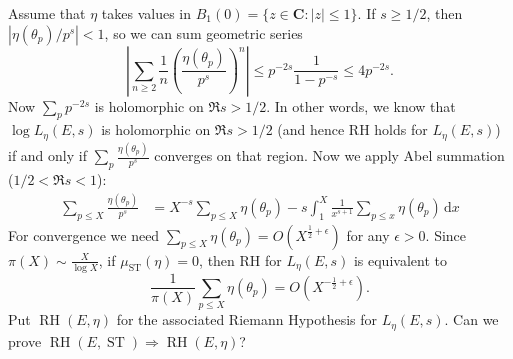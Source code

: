 \documentclass{article}
\DeclareMathOperator{\RH}{RH}
\DeclareMathOperator{\ST}{ST}
\newcommand{\bC}{\mathbf{C}}
\newcommand{\dd}{\mathrm{d}}
\numberwithin{theorem}{section}
\begin{document}
Assume that $\eta$ takes values in $B_1(0) = \{z\in \bC : |z|\leqslant 1\}$. 
If $s\geqslant 1/2$, then $|\eta(\theta_p) / p^s|<1$, so we can sum geometric 
series
\[
	\left| \sum_{n\geqslant 2} \frac{1}{n} \left(\frac{\eta(\theta_p)}{p^s}\right)^n \right|
		\leqslant p^{-2s} \frac{1}{1-p^{-s}} 
		\leqslant 4 p^{-2s}.
\]
Now $\sum_p p^{-2s}$ is holomorphic on $\Re s>1/2$. In other words, we know 
that $\log L_\eta(E,s)$ is holomorphic on $\Re s>1/2$ (and hence RH holds for 
$L_\eta(E,s)$) if and only if $\sum_p \frac{\eta(\theta_p)}{p^s}$ converges 
on that region. Now we apply Abel summation ($1/2<\Re s<1$):
\begin{align*}
	\sum_{p\leqslant X} \frac{\eta(\theta_p)}{p^s}
		&= X^{-s} \sum_{p\leqslant X} \eta(\theta_p) - s\int_1^X \frac{1}{x^{s+1}} \sum_{p\leqslant x} \eta(\theta_p) \, \dd x
\end{align*}
For convergence we need 
$\sum_{p\leqslant X} \eta(\theta_p) = O(X^{\frac 1 2 +\epsilon})$ for any 
$\epsilon>0$. Since $\pi(X) \sim \frac{X}{\log X}$, if $\mu_{\ST}(\eta)=0$, 
then RH for $L_\eta(E,s)$ is equivalent to 
\[
	\frac{1}{\pi(X)}\sum_{p\leqslant X} \eta(\theta_p) = O(X^{-\frac 1 2 + \epsilon}) .
\]
Put $\RH(E,\eta)$ for the associated Riemann Hypothesis for $L_\eta(E,s)$. 
Can we prove $\RH(E,\ST)\Rightarrow \RH(E,\eta)$?





\printbibliography
\end{document}
